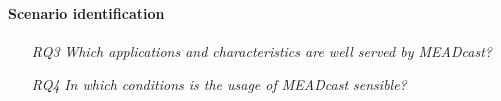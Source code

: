 
\paragraph{Scenario identification} %
\label{par:discussion_scenario}
\begin{itemize}
\item[\textit{RQ3}]
    \textit{Which applications and characteristics are well served by MEADcast?}
\item[\textit{RQ4}]
    \textit{In which conditions is the usage of MEADcast sensible?}
\end{itemize}


